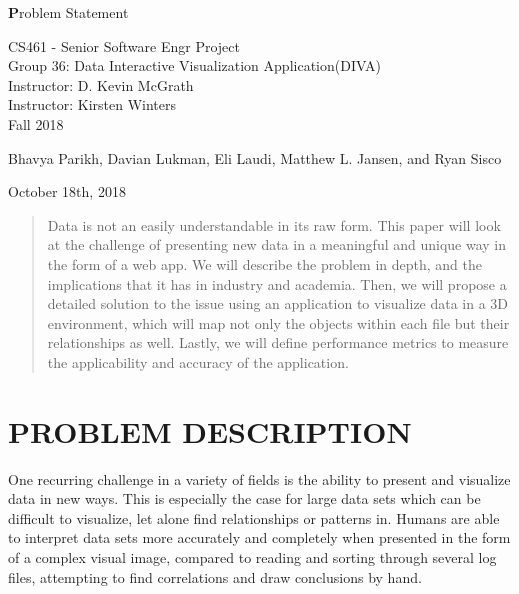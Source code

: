 \documentclass[journal,10pt,onecolumn,compsoc]{IEEEtran} \usepackage[margin=1.0in]{geometry} \usepackage{pdfpages}
\begin{document}
\begin{center}
  
  \textbf{}

  \vspace{4cm}
  \Huge{}
  \textbf Problem Statement
  \vspace{1.5cm}

 
  \LARGE
  CS461 - Senior Software Engr Project\\
  \vspace{0.25cm}
  Group 36: Data Interactive Visualization Application(DIVA)\\
  Instructor: D. Kevin McGrath \\
  Instructor: Kirsten Winters \\
  \vspace{0.25cm}
  Fall 2018 \\
  \vspace{1.5cm}
  
  \large{Bhavya Parikh, Davian Lukman, Eli Laudi, Matthew L. Jansen, and Ryan Sisco}\\
  \date{October 18th, 2018}
  \vfill
  October 18th, 2018\\
  \vspace{1cm}
  \vspace*{\fill}
   \begin{abstract}
       \noindent Data is not an easily understandable in its raw form. This paper will look at the challenge of presenting new data in a meaningful and unique way in the form of a web app. We will describe the problem in depth, and the implications that it has in industry and academia. Then, we will propose a detailed solution to the issue using an application to visualize data in a 3D environment, which will map not only the objects within each file but their relationships as well. Lastly, we will define performance metrics to measure the applicability and accuracy of the application.
   \end{abstract}
    \normalsize 
  \end{center}
\newpage
\tableofcontents
\newpage


\section{PROBLEM DESCRIPTION}
    One recurring challenge in a variety of fields is the ability to present and visualize data in new ways. This is especially the case for large data sets which can be difficult to visualize, let alone find relationships or patterns in. Humans are able to interpret data sets more accurately and completely when presented in the form of a complex visual image, compared to reading and sorting through several log files, attempting to find correlations and draw conclusions by hand.
    
\end{document}
